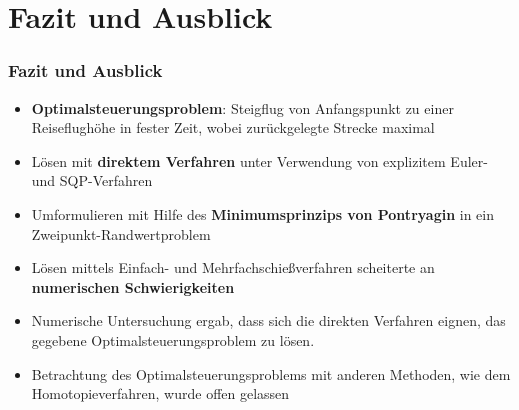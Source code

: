 \documentclass[aspectratio=169]{beamer}
\begin{document}
\section{Fazit und Ausblick}
\begin{frame}
  \frametitle{Fazit und Ausblick}
    \vspace{1em}
\small
  \begin{itemize}
    \item \textbf{Optimalsteuerungsproblem}: Steigflug von Anfangspunkt zu einer Reiseflughöhe in fester Zeit, wobei zurückgelegte Strecke maximal
     \item Lösen mit \textbf{direktem Verfahren} unter Verwendung von explizitem Euler- und SQP-Verfahren
      \item Umformulieren mit Hilfe des \textbf{Minimumsprinzips von Pontryagin} in ein Zweipunkt-Randwertproblem 
       \item Lösen mittels Einfach- und Mehrfachschießverfahren scheiterte an \textbf{numerischen Schwierigkeiten}
        \item Numerische Untersuchung ergab, dass sich die direkten Verfahren eignen, das gegebene Optimalsteuerungsproblem zu lösen.  	 \item Betrachtung des Optimalsteuerungsproblems mit anderen Methoden, wie dem Homotopieverfahren, wurde offen gelassen

  \end{itemize}
\end{frame}

\begin{frame}[plain]{}
\end{frame}


\end{document}
